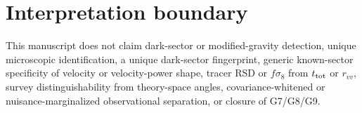 \documentclass[11pt]{article}
\newcommand{\ttot}{t_{\rm tot}}
\begin{document}


\section*{Interpretation boundary}
This manuscript does not claim dark-sector or modified-gravity detection, unique microscopic identification, a unique dark-sector fingerprint, generic known-sector specificity of velocity or velocity-power shape, tracer RSD or $f\sigma_8$ from $\ttot$ or $r_{vv}$, survey distinguishability from theory-space angles, covariance-whitened or nuisance-marginalized observational separation, or closure of G7/G8/G9.



\end{document}
